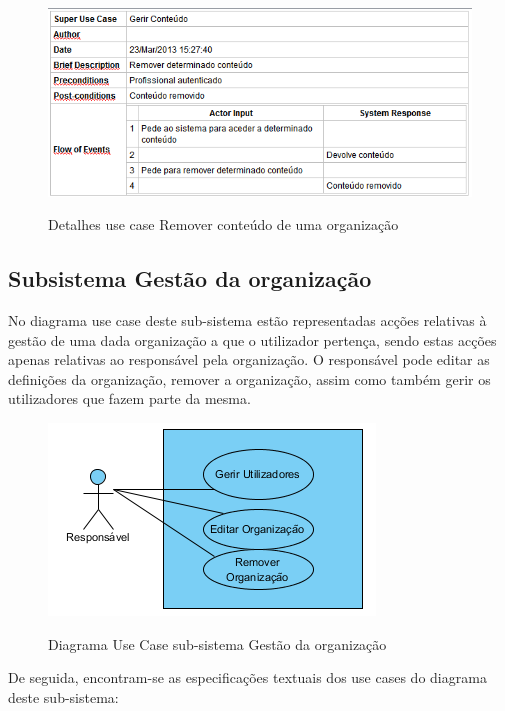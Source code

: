 ﻿\documentclass[12pt,a4paper]{article}
\begin{document}
\begin{figure}[h!]
\centering
\includegraphics[scale=0.7]{d_usecase/removerconteudo}
\label{usecase}
\caption{Detalhes use case Remover conteúdo de uma organização}
\end{figure}


\clearpage
\clearpage
\subsection{Subsistema Gestão da organização}
No diagrama use case deste sub-sistema estão representadas acções relativas à gestão de uma dada organização a que o utilizador pertença, sendo estas acções apenas relativas ao responsável pela organização. O responsável pode editar as definições da organização, remover a organização, assim como também gerir os utilizadores que fazem parte da mesma.\\

\begin{figure}[h!]
\centering
\includegraphics[scale=1]{usecase/R_GerirOrganizacao}
\label{usecase}
\caption{Diagrama Use Case sub-sistema Gestão da organização}
\end{figure}

De seguida, encontram-se as especificações textuais dos use cases do diagrama deste sub-sistema:\\
\end{document}
